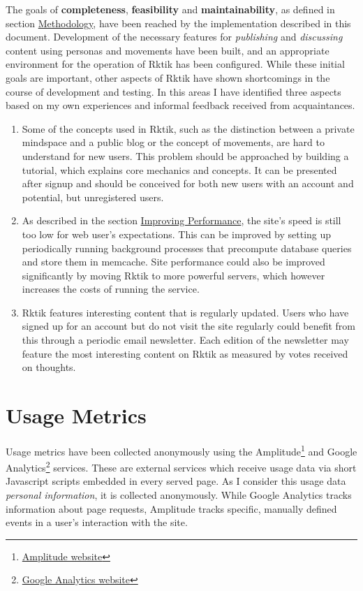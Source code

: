 The goals of \textbf{completeness}, \textbf{feasibility} and
\textbf{maintainability}, as defined in section
\hyperref[methodology]{Methodology}, have been reached by the
implementation described in this document. Development of the necessary
features for \emph{publishing} and \emph{discussing} content using
personas and movements have been built, and an appropriate environment
for the operation of Rktik has been configured. While these initial
goals are important, other aspects of Rktik have shown shortcomings in
the course of development and testing. In this areas I have identified
three aspects based on my own experiences and informal feedback received
from acquaintances.

\begin{enumerate}
\def\labelenumi{\arabic{enumi}.}
\item
  Some of the concepts used in Rktik, such as the distinction between a
  private mindspace and a public blog or the concept of movements, are
  hard to understand for new users. This problem should be approached by
  building a tutorial, which explains core mechanics and concepts. It
  can be presented after signup and should be conceived for both new
  users with an account and potential, but unregistered users.
\item
  As described in the section \hyperref[improving-performance]{Improving
  Performance}, the site's speed is still too low for web user's
  expectations. This can be improved by setting up periodically running
  background processes that precompute database queries and store them
  in memcache. Site performance could also be improved significantly by
  moving Rktik to more powerful servers, which however increases the
  costs of running the service.
\item
  Rktik features interesting content that is regularly updated. Users
  who have signed up for an account but do not visit the site regularly
  could benefit from this through a periodic email newsletter. Each
  edition of the newsletter may feature the most interesting content on
  Rktik as measured by votes received on thoughts.
\end{enumerate}

\section{Usage Metrics}\label{usage-metrics}

Usage metrics have been collected anonymously using the
Amplitude\footnote{\href{https://amplitude.com/}{Amplitude website}} and
Google Analytics\footnote{\href{https://www.google.com/analytics/}{Google
  Analytics website}} services. These are external services which
receive usage data via short Javascript scripts embedded in every served
page. As I consider this usage data \emph{personal information}, it is
collected anonymously. While Google Analytics tracks information about
page requests, Amplitude tracks specific, manually defined events in a
user's interaction with the site.

